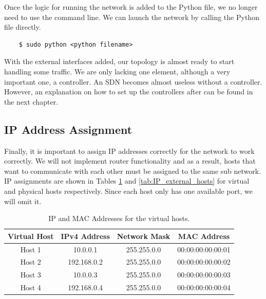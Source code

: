 Once the logic for running the network is added to the Python file, we no longer need to use the command line. We can launch the network by calling the Python file directly.
\begin{lstlisting}
    $ sudo python <python filename>
\end{lstlisting}

With the external interfaces added, our topology is almost ready to start handling some traffic. We are only lacking one element, although a very important one, a controller. An SDN becomes almost useless without a controller. However, an explanation on how to set up the controllers after can be found in the next chapter. 

\subsection{IP Address Assignment}
Finally, it is important to assign IP addresses correctly for the network to work correctly. We will not implement router functionality and as a result, hosts that want to communicate with each other must be assigned to the same sub network. IP assignments are shown in Tables \ref{tab:IP_virtual_hosts} and \ref{tab:IP_external_hosts} for virtual and physical hosts respectively. Since each host only has one available port, we will omit it.

\begin{table}
    \centering
    \caption{IP and MAC Addresses for the virtual hosts.}
    \vspace{0.1 cm}
    \begin{tabular}{c c c c}
    \hline
    \rowcolor{lightgray}
    \textbf{Virtual Host}               &\textbf{IPv4 Address} &\textbf{Network Mask}   &\textbf{MAC Address}     \\ \hline
    Host 1                              &  10.0.0.1            & 255.255.0.0            & 00:00:00:00:00:01       \\ \hline 
    Host 2                              &  192.168.0.2         & 255.255.0.0            & 00:00:00:00:00:02       \\ \hline 
    Host 3                              &  10.0.0.3            & 255.255.0.0            & 00:00:00:00:00:03       \\ \hline 
    Host 4                              &  192.168.0.4         & 255.255.0.0            & 00:00:00:00:00:04       \\ \hline 
    \end{tabular}
    \label{tab:IP_virtual_hosts}
\end{table}

